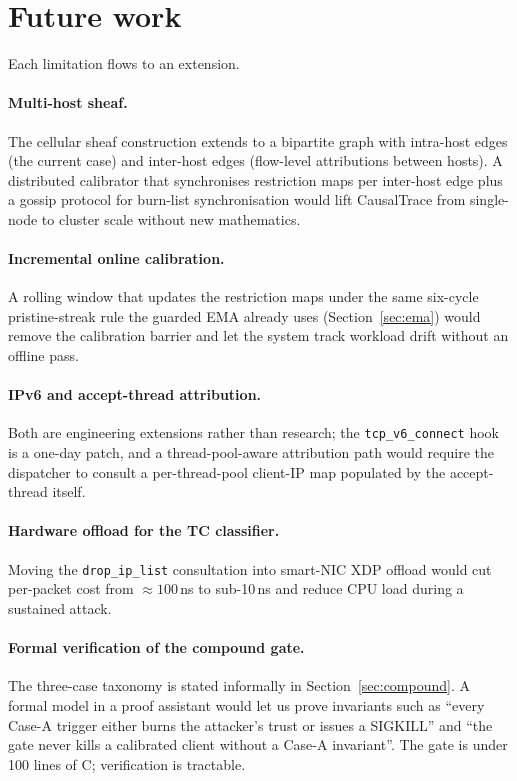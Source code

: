 \section{Future work}
\label{sec:conclusion-future}

Each limitation flows to an extension.

\paragraph{Multi-host sheaf.} The cellular sheaf construction extends to
a bipartite graph with intra-host edges (the current case) and inter-host
edges (flow-level attributions between hosts). A distributed calibrator
that synchronises restriction maps per inter-host edge plus a gossip
protocol for burn-list synchronisation would lift CausalTrace from
single-node to cluster scale without new mathematics.

\paragraph{Incremental online calibration.} A rolling window that updates
the restriction maps under the same six-cycle pristine-streak rule the
guarded EMA already uses (Section~\ref{sec:ema}) would remove the
calibration barrier and let the system track workload drift without an
offline pass.

\paragraph{IPv6 and accept-thread attribution.} Both are engineering
extensions rather than research; the \texttt{tcp\_v6\_connect} hook is a
one-day patch, and a thread-pool-aware attribution path would require
the dispatcher to consult a per-thread-pool client-IP map populated by
the accept-thread itself.

\paragraph{Hardware offload for the TC classifier.} Moving the
\texttt{drop\_ip\_list} consultation into smart-NIC XDP offload would cut
per-packet cost from $\approx\!100$\,ns to sub-10\,ns and reduce CPU
load during a sustained attack.

\paragraph{Formal verification of the compound gate.} The three-case
taxonomy is stated informally in Section~\ref{sec:compound}. A formal
model in a proof assistant would let us prove invariants such as
``every Case-A trigger either burns the attacker's trust or issues a
SIGKILL'' and ``the gate never kills a calibrated client without a
Case-A invariant''. The gate is under 100 lines of C; verification is
tractable.

